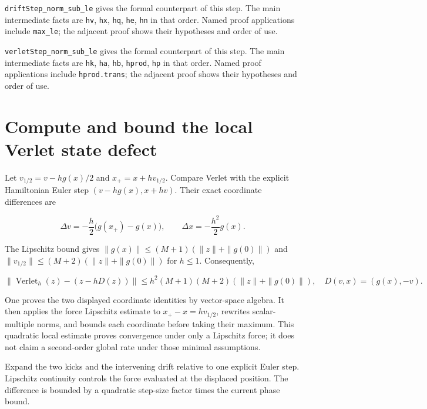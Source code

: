 \documentclass[11pt,a4paper]{article}
\begin{document}
\begin{leanbox}
\texttt{drift\allowbreak{}Step\_\allowbreak{}norm\_\allowbreak{}sub\_\allowbreak{}le} gives the formal counterpart of this step. The main intermediate facts are \texttt{hv}, \texttt{hx}, \texttt{hq}, \texttt{he}, \texttt{hn} in that order. Named proof applications include \texttt{max\_\allowbreak{}le}; the adjacent proof shows their hypotheses and order of use.




\texttt{verlet\allowbreak{}Step\_\allowbreak{}norm\_\allowbreak{}sub\_\allowbreak{}le} gives the formal counterpart of this step. The main intermediate facts are \texttt{hk}, \texttt{ha}, \texttt{hb}, \texttt{hprod}, \texttt{hp} in that order. Named proof applications include \texttt{hprod.\allowbreak{}trans}; the adjacent proof shows their hypotheses and order of use.
\end{leanbox}

\section{\texorpdfstring{Compute and bound the local Verlet state defect}{Compute and bound the local Verlet state defect}}


Let \(v_{1/2}=v-hg(x)/2\) and \(x_+=x+hv_{1/2}\). Compare Verlet with the explicit Hamiltonian Euler step \((v-hg(x),x+hv)\). Their exact coordinate differences are

\[\Delta v=-\frac h2\bigl(g(x_+)-g(x)\bigr),\qquad\Delta x=-\frac{h^2}{2}g(x).\]

The Lipschitz bound gives \(\|g(x)\|\le(M+1)(\|z\|+\|g(0)\|)\) and \(\|v_{1/2}\|\le(M+2)(\|z\|+\|g(0)\|)\) for \(h\le1\). Consequently,

\[\|\operatorname{Verlet}_h(z)-(z-hD(z))\|\le h^2(M+1)(M+2)(\|z\|+\|g(0)\|),\quad D(v,x)=(g(x),-v).\]

One proves the two displayed coordinate identities by vector-space algebra. It then applies the force Lipschitz estimate to \(x_+-x=hv_{1/2}\), rewrites scalar-multiple norms, and bounds each coordinate before taking their maximum. This quadratic local estimate proves convergence under only a Lipschitz force; it does not claim a second-order global rate under those minimal assumptions.



Expand the two kicks and the intervening drift relative to one explicit Euler step. Lipschitz continuity controls the force evaluated at the displaced position. The difference is bounded by a quadratic step-size factor times the current phase bound.
\end{document}
